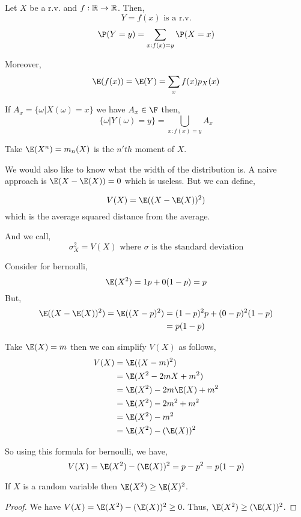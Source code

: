 \begin{theorem}
	Let $X$ be a r.v. and  $f: \mathbb{R} \to \mathbb{R}$. Then, 
	$$ Y = f(x) \text{ is a r.v.} $$  
	$$\P(Y= y) = \sum_{x : f(x) = y} \P(X = x)$$

	Moreover, 
	$$ \E(f(x)  ) = \E(Y) =\sum_x f(x) p_X(x) $$
\end{theorem}

\begin{remark}
	If $A_x = \{\omega | X(\omega) = x\} $ we have $A_x \in \F$ then,  
	$$ \{\omega | Y(\omega) = y\}  = \bigcup_{x : f(x) = y} A_x $$ 
\end{remark}


\begin{eg}
	Take $\E(X^n) = m_n(X)$ is the $n'th$ moment of  $X$.

	\vspace{1em}
	

	We would also like to know what the width of the distribution is. A naive approach is $\E(X - \E(X)) = 0$ which is useless. But we can define, 
	 
	$$ V(X) = \E((X - \E(X))^2) $$ 
	which is the average squared distance from the average.

	And we call, 
	$$ \sigma_X^2 = V(X) \text{ where $\sigma$ is the standard deviation}$$ 
\end{eg}

\begin{eg}
	Consider for bernoulli,
	$$ \E(X^2)  = 1 p + 0 (1 - p) = p$$ 
	But, 
	\begin{align*}
		\E((X - \E(X))^2) = \E((X - p)^2) &= (1 - p)^2 p + (0 - p)^2 (1 - p) \\
		                               &= p(1 - p)
	\end{align*}
\end{eg}

\begin{remark}
	Take $\E(X) = m$ then we can simplify $V(X)$ as follows,
	\begin{align*}
		\label{eq:simplify-variance}
		V(X) &= \E((X - m)^2) \\
		     &= \E(X^2 - 2mX + m^2) \\
		     &= \E(X^2) - 2m\E(X) + m^2 \\
		     &= \E(X^2) - 2m^2 + m^2 \\
		     &= \E(X^2) - m^2 \\
		     &= \E(X^2) - (\E(X))^2		
	\end{align*}

	So using this formula for bernoulli, we have,
	$$ V(X) = \E(X^2) - (\E(X))^2 = p - p^2 = p(1 - p) $$
\end{remark}

\begin{theorem}
	If $X$ is a random variable then $\E(X^2)\ge \E(X)^2$.
\end{theorem}
\begin{proof}
	We have $V(X) = \E(X^2) - (\E(X))^2 \ge 0$. Thus, $\E(X^2) \ge (\E(X))^2$.
\end{proof}
